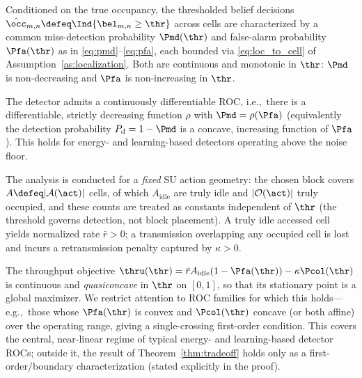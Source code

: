 \begin{assumption}
\label{as:cellerror}
Conditioned on the true occupancy, the thresholded belief decisions
$\hat{\occ}_{m,n}\defeq\Ind\{\bel_{m,n}\ge\thr\}$ across cells are
characterized by a common miss-detection probability $\Pmd(\thr)$ and
false-alarm probability $\Pfa(\thr)$ as in \eqref{eq:pmd}--\eqref{eq:pfa},
each bounded via \eqref{eq:loc_to_cell} of
Assumption~\ref{as:localization}. Both are continuous and monotonic in
$\thr$: $\Pmd$ is non-decreasing and $\Pfa$ is non-increasing in $\thr$.
\end{assumption}

\begin{assumption}
\label{as:roc}
The detector admits a continuously differentiable ROC, i.e.,\ there is a
differentiable, strictly decreasing function $\rho$ with
$\Pmd = \rho(\Pfa)$ (equivalently the detection probability
$P_{\mathrm{d}}=1-\Pmd$ is a concave, increasing function of $\Pfa$). This
holds for energy- and learning-based detectors operating above the
noise floor.
\end{assumption}

\begin{assumption}
\label{as:rate}
The analysis is conducted for a \emph{fixed} SU action geometry: the chosen
block covers $A\defeq|\mathcal{A}(\act)|$ cells, of which $A_{\mathrm{idle}}$
are truly idle and $|\mathcal{O}(\act)|$ truly occupied, and these counts are
treated as constants independent of $\thr$ (the threshold governs detection,
not block placement). A truly idle accessed cell yields normalized rate
$\bar r>0$; a transmission overlapping any occupied cell is lost and incurs a
retransmission penalty captured by $\kappa>0$.
\end{assumption}

\begin{assumption}
\label{as:concave}
The throughput objective $\thru(\thr)=\bar r A_{\mathrm{idle}}(1-\Pfa(\thr))
-\kappa\Pcol(\thr)$ is continuous and \emph{quasiconcave} in $\thr$ on
$[0,1]$, so that its stationary point is a global maximizer. We restrict
attention to ROC families for which this holds---e.g.,\ those whose
$\Pfa(\thr)$ is convex and $\Pcol(\thr)$ concave (or both affine) over the
operating range, giving a single-crossing first-order condition. This covers
the central, near-linear regime of typical energy- and learning-based
detector ROCs; outside it, the result of Theorem~\ref{thm:tradeoff} holds
only as a first-order/boundary characterization (stated explicitly in the
proof).
\end{assumption}

